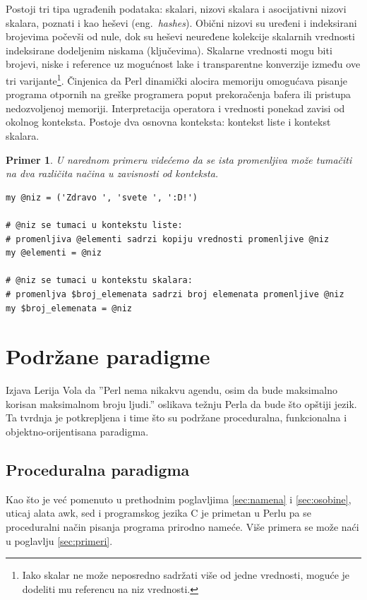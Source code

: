 \documentclass[a4paper]{article}
\newtheorem{primer}{Primer}[section]
\begin{document}
Postoji tri tipa ugrađenih podataka: skalari, nizovi skalara i asocijativni nizovi skalara, poznati i kao heševi (eng.~{\em hashes}). Obični nizovi su uređeni i indeksirani brojevima počevši od nule, dok su heševi neuređene kolekcije skalarnih vrednosti indeksirane dodeljenim niskama (ključevima). Skalarne vrednosti mogu biti brojevi, niske i reference uz mogućnost lake i transparentne konverzije između ove tri varijante\footnote{Iako skalar ne može neposredno sadržati više od jedne vrednosti, moguće je dodeliti mu referencu na niz vrednosti.}. Činjenica da Perl dinamički alocira memoriju omogućava pisanje programa otpornih na greške programera poput prekoračenja bafera ili pristupa nedozvoljenoj memoriji. Interpretacija operatora i vrednosti ponekad zavisi od okolnog konteksta. Postoje dva osnovna konteksta: kontekst liste i kontekst skalara.\cite{perldoc}
\begin{primer}
U narednom primeru videćemo da se ista promenljiva može tumačiti na dva različita načina u zavisnosti od konteksta. 
\end{primer}
\begin{lstlisting}[label = kontekst]
my @niz = ('Zdravo ', 'svete ', ':D!')    

# @niz se tumaci u kontekstu liste:
# promenljiva @elementi sadrzi kopiju vrednosti promenljive @niz
my @elementi = @niz        

# @niz se tumaci u kontekstu skalara:
# promenljva $broj_elemenata sadrzi broj elemenata promenljive @niz
my $broj_elemenata = @niz
\end{lstlisting} 



\section{Podržane paradigme}

Izjava Lerija Vola da ''Perl nema nikakvu agendu, osim da bude maksimalno korisan maksimalnom broju ljudi.''\cite{walltalk} oslikava težnju Perla da bude što opštiji jezik. Ta tvrdnja je potkrepljena i time što su podržane proceduralna, funkcionalna i objektno-orijentisana paradigma. 

\subsection{Proceduralna paradigma}
Kao što je već pomenuto u prethodnim poglavljima \ref{sec:namena} i \ref{sec:osobine}, uticaj alata awk, sed i programskog jezika C je primetan u Perlu pa se proceduralni način pisanja programa prirodno nameće. Više primera se može naći u poglavlju \ref{sec:primeri}.
\end{document}
